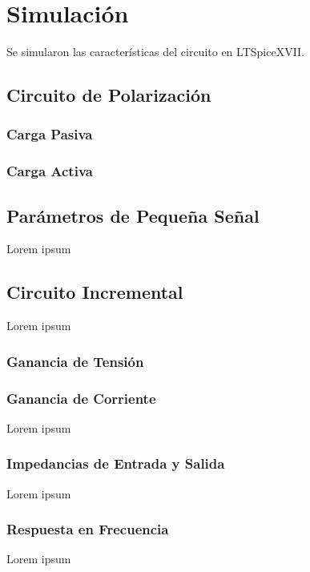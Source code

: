 \chapter{Simulación}

Se simularon las características del circuito en LTSpiceXVII.

\section{Circuito de Polarización}

\subsection{Carga Pasiva}


\subsection{Carga Activa}

\section{Parámetros de Pequeña Señal}
Lorem ipsum
\section{Circuito Incremental}
Lorem ipsum
\subsection{Ganancia de Tensión}
\subsection{Ganancia de Corriente}
Lorem ipsum
\subsection{Impedancias de Entrada y Salida}
Lorem ipsum
\subsection{Respuesta en Frecuencia}
Lorem ipsum